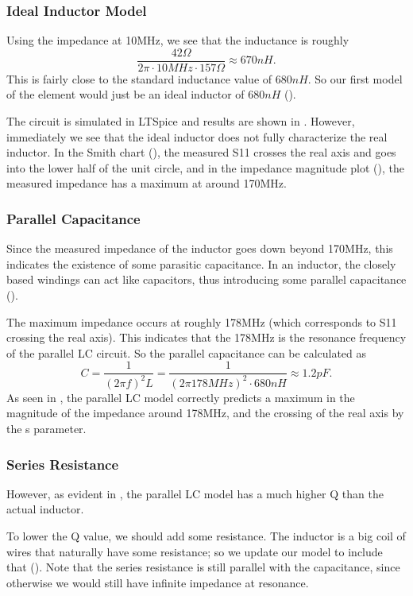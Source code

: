 \documentclass{article}
\begin{document}
\subsubsection{Ideal Inductor Model}

Using the impedance at 10MHz, we see that the inductance is roughly
$$\frac{42\Omega}{2\pi\cdot 10MHz \cdot 157 \Omega} \approx 670nH .$$
This is fairly close to the standard inductance value of $680nH$.
So our first model of the element would just be an ideal inductor of $680nH$ ().

The circuit is simulated in LTSpice and results are shown in .
However, immediately we see that the ideal inductor does not fully characterize the real inductor.
In the Smith chart (), the measured S11 crosses the real axis and goes into the lower half of the unit circle, and in the impedance magnitude plot (), the measured impedance has a maximum at around 170MHz.


\subsubsection{Parallel Capacitance}
Since the measured impedance of the inductor goes down beyond 170MHz, this indicates the existence of some parasitic capacitance.
In an inductor, the closely based windings can act like capacitors, thus introducing some parallel capacitance ().

The maximum impedance occurs at roughly 178MHz (which corresponds to S11 crossing the real axis).
This indicates that the 178MHz is the resonance frequency of the parallel LC circuit.
So the parallel capacitance can be calculated as
\[
    C = \frac{1}{(2\pi f)^2 L}
    = \frac{1}{(2\pi 178MHz)^2 \cdot 680nH}
    \approx
    1.2pF.
\]
As seen in , the parallel LC model correctly predicts a maximum in the magnitude of the impedance around 178MHz, and the crossing of the real axis by the s parameter.

\subsubsection{Series Resistance}
However, as evident in , the parallel LC model has a much higher Q than the actual inductor.

To lower the Q value, we should add some resistance.
The inductor is a big coil of wires that naturally have some resistance;
so we update our model to include that ().
Note that the series resistance is still parallel with the capacitance, since otherwise we would still have infinite impedance at resonance.
\end{document}

